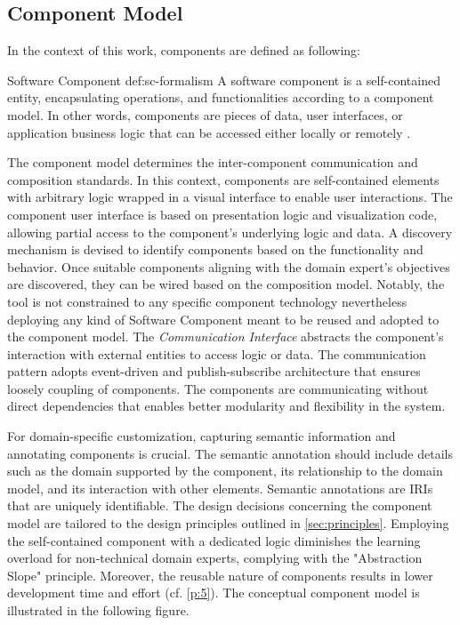 \vspace{-20pt}
\hypertarget{sec:component-model}{%
\subsection{Component Model}\label{sec:component-model}}
\vspace{10pt}
In the context of this work, components are defined as following: 

\vspace{-15pt}
\begin{thesisdefinition}{Software Component }{def:sc-formalism}
A software component is a self-contained entity, encapsulating operations, and functionalities according to a component model. In other words, components are pieces of data, user interfaces, or application business logic that can be accessed either locally or remotely \autocite{Chemnitz2017}.
\end{thesisdefinition}

The component model determines the inter-component communication and composition standards. In this context, components are self-contained elements with arbitrary logic wrapped in a visual interface to enable user interactions. The component user interface is based on presentation logic and visualization code, allowing partial access to the component's underlying logic and data. A discovery mechanism is devised to identify components based on the functionality and behavior.  Once suitable components aligning with the domain expert's objectives are discovered, they can be wired based on the composition model. Notably, the tool is not constrained to any specific component technology nevertheless deploying any kind of \gls{Software Component} meant to be reused and adopted to the component model. 
The \emph{Communication Interface} abstracts the component’s interaction with external entities to access logic or data. The communication pattern adopts event-driven and publish-subscribe architecture that ensures loosely coupling of components. The components are communicating without direct dependencies that enables better modularity and flexibility in the system.

For domain-specific customization, capturing semantic information and annotating components is crucial. The semantic annotation should include details such as the domain supported by the component, its relationship to the domain model, and its interaction with other elements. Semantic annotations are IRIs that are uniquely identifiable.
The design decisions concerning the component model are tailored to the design principles outlined in \cref{sec:principles}. Employing the self-contained component with a dedicated logic diminishes the learning overload for non-technical domain experts, complying with the "Abstraction Slope" principle. Moreover, the reusable nature of components results in lower development time and effort (cf. \cref{p:5}). The conceptual component model is illustrated in the following figure.

